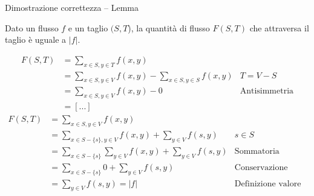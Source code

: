\begin{frame}{Dimostrazione correttezza -- Lemma    }
    
\vspace{-3pt}
\begin{myboxtitle}
Dato un flusso $f$ e un taglio $(S,T$), la quantità di flusso
$F(S,T)$ che attraversa il taglio è uguale a $|f|$.
\end{myboxtitle}

\small
\begin{overprint}
\begin{align*}
F(S,T) &= \sum_{x \in S, y \in T} f(x,y) \\
       &= \sum_{x \in S, y \in V} f(x,y) - \sum_{x \in S, y \in S} f(x,y)& T = V - S\\ 
       &= \sum_{x \in S, y \in V} f(x,y) - 0& \textrm{Antisimmetria}\\
       &= [...] 
\end{align*}
\begin{align*}
F(S,T) &= \sum_{x \in S, y \in V} f(x,y)& \\ 
       &= \sum_{x \in S-\{s\}, y \in V} f(x,y) + \sum_{y \in V} f(s,y) & s \in S\\ 
       &= \sum_{x \in S-\{s\}} \sum_{y \in V} f(x,y) + \sum_{y \in V} f(s,y) & \mathrm{Sommatoria}\\ 
       &= \sum_{x \in S-\{s\}} 0 + \sum_{y \in V} f(s,y) & \textrm{Conservazione flusso}\\ 
       &= \sum_{y \in V} f(s,y) = |f| & \textrm{Definizione valore flusso}
\end{align*}
\end{overprint}
        
\end{frame}




